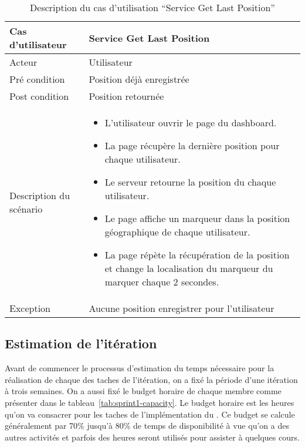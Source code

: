 \begin{table}[H]
    \centering
    \begin{tabular}{| p{3cm} | l |}
        \hline
        Cas d'utilisateur & Service Get Last Position \\ \hline
        Acteur & Utilisateur \\ \hline
        Pré condition & Position déjà enregistrée \\ \hline
        Post condition & Position retournée \\ \hline
        Description du scénario &
        \begin{minipage}{11cm}
            \vspace*{0.2cm}
            \begin{itemize}
                \item L'utilisateur ouvrir le page du dashboard.
                \item La page récupère la dernière position pour chaque utilisateur.
                \item Le serveur retourne la position du chaque utilisateur.
                \item Le page affiche un marqueur dans la position géographique de chaque utilisateur.
                \item La page répète la récupération de la position et change la localisation du marqueur du marquer chaque 2 secondes.
            \end{itemize}
            \vspace{0.1cm}
        \end{minipage} \\ \hline
        Exception & Aucune position enregistrer pour l'utilisateur \\ \hline
    \end{tabular}
    \caption{Description du cas d'utilisation ``Service Get Last Position''}
\end{table}

\subsection{Estimation de l'itération}

Avant de commencer le processus d'estimation du temps nécessaire pour la
réalisation de chaque des taches de l'itération, on a fixé la période d'une
itération à trois semaines. On a aussi fixé le budget horaire de chaque membre
comme présenter dans le tableau~\ref{tab:sprint1-capacity}. Le budget horaire
est les heures qu'on va consacrer pour les taches de l'implémentation du
. Ce budget se calcule généralement par 70\% jusqu'à 80\%
de temps de disponibilité à  vue qu'on a des autres
activités et parfois des heures seront utilisés pour assister à quelques cours.

